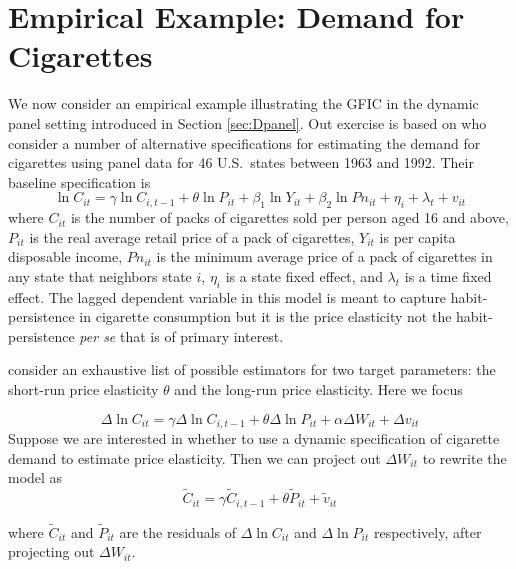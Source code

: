 \section{Empirical Example: Demand for Cigarettes}
\label{sec:cigarettes}
We now consider an empirical example illustrating the GFIC in the dynamic panel setting introduced in Section \ref{sec:Dpanel}.
Out exercise is based on \cite{BaltagiEtAl2000} who consider a number of alternative specifications for estimating the demand for cigarettes using panel data for 46 U.S.\ states between 1963 and 1992. 
Their baseline specification is
\[
  \ln C_{it} =  \gamma \ln C_{i,t-1} + \theta \ln P_{it} + \beta_1 \ln Y_{it} + \beta_2 \ln Pn_{it} + \eta_i + \lambda_t + v_{it}
\] 
where $C_{it}$ is the number of packs of cigarettes sold per person aged 16 and above, $P_{it}$ is the real average retail price of a pack of cigarettes, $Y_{it}$ is per capita disposable income, $Pn_{it}$ is the minimum average price of a pack of cigarettes in any state that neighbors state $i$, $\eta_i$ is a state fixed effect, and $\lambda_t$ is a time fixed effect. 
The lagged dependent variable in this model is meant to capture habit-persistence in cigarette consumption but it is the price elasticity not the habit-persistence \emph{per se} that is of primary interest. 

\cite{BaltagitEtAl2000} consider an exhaustive list of possible estimators for two target parameters: the short-run price elasticity $\theta$ and the long-run price elasticity.
Here we focus 

\[
\Delta \ln C_{it} = \gamma \Delta \ln C_{i,t-1} +  \theta \Delta \ln P_{it} +\alpha \Delta W_{it} +  \Delta v_{it}
\]
 Suppose we are interested in whether to use a dynamic specification of cigarette demand to estimate price elasticity. Then we can project out $\Delta W_{it}$ to rewrite the model as
\[
\widetilde{C}_{it} = \gamma \widetilde{C}_{i,t-1} + \theta \widetilde{P}_{it} + \widetilde{v}_{it} 
\] 
 
 where $\widetilde{C}_{it}$ and $\widetilde{P}_{it}$ are the residuals of $\Delta \ln C_{it}$ and $\Delta \ln P_{it}$ respectively, after projecting out $\Delta W_{it}$.
 
